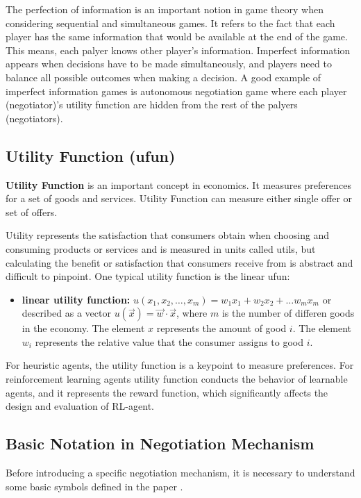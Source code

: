 The perfection of information is an important notion in game theory when considering sequential and simultaneous games. It refers to the fact that each player has the same information that would be available at the end of the game. This means, each palyer knows other player's information. Imperfect information appears when decisions have to be made simultaneously, and players need to balance all possible outcomes when making a decision. A good example of imperfect information games is autonomous negotiation game where each player (negotiator)'s utility function are hidden from the rest of the palyers (negotiators).

\subsection{Utility Function (ufun)}
\textbf{Utility Function} is an important concept in economics. It measures preferences for a set of goods and services. Utility Function can measure either single offer or set of offers.

Utility represents the satisfaction that consumers obtain when choosing and consuming products or services and is measured in units called utils, but calculating the benefit or satisfaction that consumers receive from is abstract and difficult to pinpoint\parencite{ANDRIY2019}. One typical utility function is the linear ufun:

\begin{itemize}
\item \textbf{linear utility function:} $u\left(x_{1}, x_{2}, \ldots, x_{m}\right)=w_{1} x_{1}+w_{2} x_{2}+\ldots w_{m} x_{m}$ or described as a vector $u(\vec{x})=\vec{w} \cdot \vec{x}$, where $m$ is the number of differen goods in the economy. The element $x$ represents the amount of good $i$. The element $w_i$ represents the relative value that the consumer assigns to good $i$.
\end{itemize}

For heuristic agents, the utility function is a keypoint to measure preferences. For reinforcement learning agents utility function conducts the behavior of learnable agents, and it represents the reward function, which significantly affects the design and evaluation of RL-agent.

\subsection{Basic Notation in Negotiation Mechanism} \label{background:autonmous-negotiation:basic-notation}
Before introducing a specific negotiation mechanism, it is necessary to understand some basic symbols defined in the paper \parencite{Aydoğan2017}.

